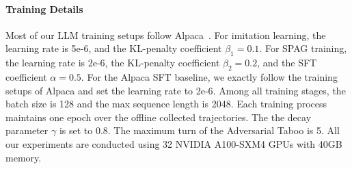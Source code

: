 \documentclass{article}
\theoremstyle{plain}
\theoremstyle{definition}
\theoremstyle{remark}
\begin{document}
\paragraph{Training Details} 
Most of our LLM training setups follow Alpaca~\citep{alpaca}.
For imitation learning, the learning rate is 5e-6, and the KL-penalty coefficient $\beta_1=0.1$. For SPAG training, the learning rate is 2e-6,  the KL-penalty coefficient $\beta_2=0.2$, and the SFT coefficient $\alpha=0.5$.
For the Alpaca SFT baseline, we exactly follow the training setups of Alpaca and set the learning rate to 2e-6. Among all training stages, the batch size is 128 and the max sequence length is 2048. Each training process maintains one epoch over the offline collected trajectories. The 
the decay parameter $\gamma$ is set to 0.8. The maximum turn of the Adversarial Taboo is 5. All our experiments are conducted using
32 NVIDIA A100-SXM4 GPUs with 40GB memory.
\end{document}
